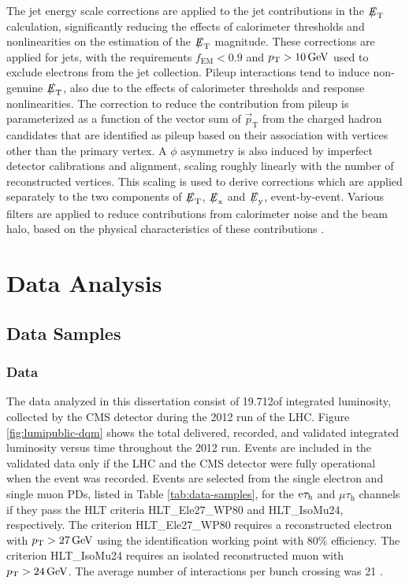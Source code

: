 \documentclass[12pt]{thesis}  %
\newcommand{\tauh}{\ensuremath{\tau_{\text{h}}}\xspace}
\newcommand{\Pe}{\ensuremath{\cmsSymbolFace{e}}\xspace}
\newcommand{\mutau}{\ensuremath{\mu\tauh}\xspace}
\newcommand{\etau}{\ensuremath{\Pe\tauh}\xspace}
\def\eslash{\ensuremath{{\hbox{$E$\kern-0.6em\lower-.05ex\hbox{/}\kern0.10em}}}}
\def\vecpt{\mbox{$\vec{p}_\text{T}$}\xspace} %
\def\met{\mbox{$\eslash_\text{T}$}\xspace} %
\def\mex{\mbox{$\eslash_\text{x}$}\xspace} %
\def\mey{\mbox{$\eslash_\text{y}$}\xspace} %
\begin{document}
The jet energy scale corrections are applied to the jet contributions in the \met calculation, significantly reducing the effects of calorimeter thresholds and nonlinearities on the estimation of the \met magnitude. These corrections are applied for jets, with the requirements $f_{\text{EM}}<0.9$ and $p_{\mathrm{T}}>10\,\text{Ge\hspace{-.08em}V}$ used to exclude electrons from the jet collection. Pileup interactions tend to induce non-genuine \met, also due to the effects of calorimeter thresholds and response nonlinearities. The correction to reduce the contribution from pileup is parameterized as a function of the vector sum of \vecpt from the charged hadron candidates that are identified as pileup based on their association with vertices other than the primary vertex. A $\phi$ asymmetry is also induced by imperfect detector calibrations and alignment, scaling roughly linearly with the number of reconstructed vertices. This scaling is used to derive corrections which are applied separately to the two components of \met, \mex and \mey, event-by-event. Various filters are applied to reduce contributions from calorimeter noise and the beam halo, based on the physical characteristics of these contributions \cite{METperf2011}.
\chapter{Data Analysis
\label{ch:analysis}}

\section{Data Samples}

\subsection{Data
\label{sec:obsdatasamples}}

The data analyzed in this dissertation consist of 19.712\fbinv of integrated luminosity, collected by the CMS detector during the 2012 run of the LHC. Figure \ref{fig:lumipublic-dqm} shows the total delivered, recorded, and validated integrated luminosity versus time throughout the 2012 run. Events are included in the validated data only if the LHC and the CMS detector were fully operational when the event was recorded. Events are selected from the single electron and single muon PDs, listed in Table \ref{tab:data-samples}, for the \etau and \mutau channels if they pass the HLT criteria HLT\_Ele27\_WP80 and HLT\_IsoMu24, respectively. The criterion HLT\_Ele27\_WP80 requires a reconstructed electron with $p_{\mathrm{T}}>27\,\text{Ge\hspace{-.08em}V}$ using the identification working point with 80\% efficiency. The criterion HLT\_IsoMu24 requires an isolated reconstructed muon with $p_{\mathrm{T}}>24\,\text{Ge\hspace{-.08em}V}$. The average number of interactions per bunch crossing was 21 \cite{LumiPublic}.
\end{document}
